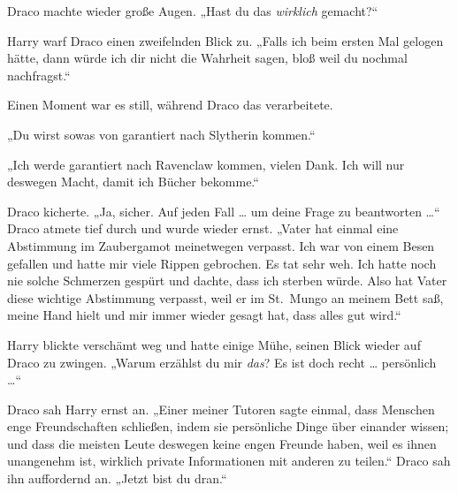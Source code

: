 Draco machte wieder große Augen.
„Hast du das \emph{wirklich} gemacht?“

Harry warf Draco einen zweifelnden Blick zu.
„Falls ich beim ersten Mal gelogen hätte, dann würde ich dir nicht die Wahrheit sagen, bloß weil du nochmal nachfragst.“

Einen Moment war es still, während Draco das verarbeitete.

„Du wirst sowas von garantiert nach Slytherin kommen.“

„Ich werde garantiert nach Ravenclaw kommen, vielen Dank. Ich will nur deswegen Macht, damit ich Bücher bekomme.“

Draco kicherte.
„Ja, sicher. Auf jeden Fall … um deine Frage zu beantworten …“ Draco atmete tief durch und wurde wieder ernst.
„Vater hat einmal eine Abstimmung im Zaubergamot meinetwegen verpasst. Ich war von einem Besen gefallen und hatte mir viele Rippen gebrochen. Es tat sehr weh. Ich hatte noch nie solche Schmerzen gespürt und dachte, dass ich sterben würde. Also hat Vater diese wichtige Abstimmung verpasst, weil er im St.~Mungo an meinem Bett saß, meine Hand hielt und mir immer wieder gesagt hat, dass alles gut wird.“

Harry blickte verschämt weg und hatte einige Mühe, seinen Blick wieder auf Draco zu zwingen.
„Warum erzählst du mir \emph{das}? Es ist doch recht … persönlich …“

Draco sah Harry ernst an.
„Einer meiner Tutoren sagte einmal, dass Menschen enge Freundschaften schließen, indem sie persönliche Dinge über einander wissen; und dass die meisten Leute deswegen keine engen Freunde haben, weil es ihnen unangenehm ist, wirklich private Informationen mit anderen zu teilen.“ Draco sah ihn auffordernd an.
„Jetzt bist du dran.“

